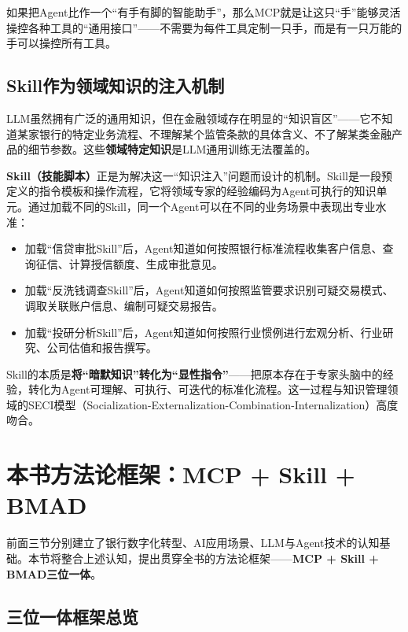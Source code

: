 如果把Agent比作一个``有手有脚的智能助手''，那么MCP就是让这只``手''能够灵活操控各种工具的``通用接口''——不需要为每件工具定制一只手，而是有一只万能的手可以操控所有工具。

\subsection{Skill作为领域知识的注入机制}

LLM虽然拥有广泛的通用知识，但在金融领域存在明显的``知识盲区''——它不知道某家银行的特定业务流程、不理解某个监管条款的具体含义、不了解某类金融产品的细节参数。这些\textbf{领域特定知识}是LLM通用训练无法覆盖的。

\textbf{Skill（技能脚本）}正是为解决这一``知识注入''问题而设计的机制。Skill是一段预定义的指令模板和操作流程，它将领域专家的经验编码为Agent可执行的知识单元。通过加载不同的Skill，同一个Agent可以在不同的业务场景中表现出专业水准：

\begin{itemize}[leftmargin=2em]
  \item 加载``信贷审批Skill''后，Agent知道如何按照银行标准流程收集客户信息、查询征信、计算授信额度、生成审批意见。
  \item 加载``反洗钱调查Skill''后，Agent知道如何按照监管要求识别可疑交易模式、调取关联账户信息、编制可疑交易报告。
  \item 加载``投研分析Skill''后，Agent知道如何按照行业惯例进行宏观分析、行业研究、公司估值和报告撰写。
\end{itemize}

Skill的本质是\textbf{将``暗默知识''转化为``显性指令''}——把原本存在于专家头脑中的经验，转化为Agent可理解、可执行、可迭代的标准化流程。这一过程与知识管理领域的SECI模型（Socialization-Externalization-Combination-Internalization）高度吻合。


\section{本书方法论框架：MCP + Skill + BMAD}

前面三节分别建立了银行数字化转型、AI应用场景、LLM与Agent技术的认知基础。本节将整合上述认知，提出贯穿全书的方法论框架——\textbf{MCP + Skill + BMAD三位一体}。

\subsection{三位一体框架总览}

